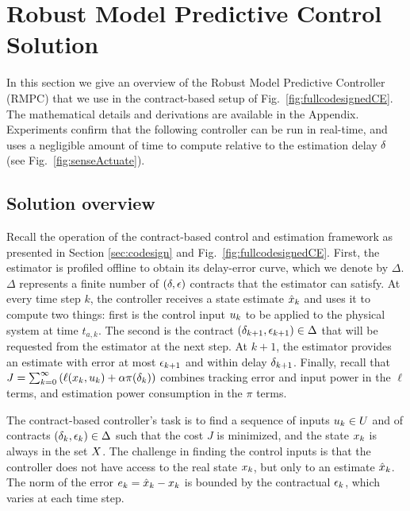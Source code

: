 \section{Robust Model Predictive Control Solution}
\label{robustMPC}

In this section we give an overview of the Robust Model Predictive Controller (RMPC) that we use in the contract-based setup of Fig.~\ref{fig:fullcodesignedCE}.
The mathematical details and derivations are available in the Appendix.
Experiments confirm that the following controller can be run in real-time, and uses a negligible amount of time to compute relative to the estimation delay $\delta$ (see Fig.~\ref{fig:senseActuate}).

\subsection{Solution overview}
Recall the operation of the contract-based control and estimation framework as presented in Section \ref{sec:codesign} and Fig.~\ref{fig:fullcodesignedCE}.
First, the estimator is profiled offline to obtain its delay-error curve, which we denote by $\Delta$.
$\Delta$ represents a finite number of $(\delta,\epsilon)$ contracts that the estimator can satisfy.
At every time step $k$, the controller receives a state estimate $\hat{x}_k$ and uses it to compute two things:
first is the control input $u_{k}$ to be applied to the physical system at time $t_{a,k}$.
The second is the contract $(\delta_{k+1}, \epsilon_{k+1}) \in \Delta$ that will be requested from the estimator at the next step.
At $k+1$, the estimator provides an estimate with error at most $\epsilon_{k+1}$ and within delay $\delta_{k+1}$.
Finally, recall that $J = \sum_{k=0}^{\infty}\left(\ell(x_k,u_k)+ \alpha \pi(\delta_k)\right)$ combines tracking error and input power in the $\ell$ terms, and estimation power consumption in the $\pi$ terms.

The contract-based controller's task is to find a sequence of inputs $u_k \in U$ and of contracts $(\delta_k, \epsilon_k) \in \Delta$ such that the cost $J$ is minimized, and the state $x_k$ is always in the set $X$.
The challenge in finding the control inputs is that the controller does not have access to the real state $x_k$, but only to an estimate $\hat{x}_k$.
The norm of the error $e_k = \hat{x}_k - x_k$ is bounded by the contractual $\epsilon_k$, which varies at each time step.

